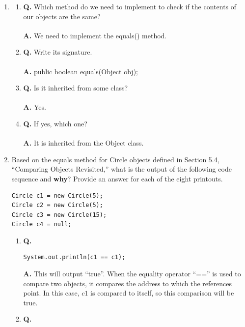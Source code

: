 \documentclass[12pt]{article}
\begin{document}
\begin{enumerate}
\begin{enumerate}[label=\Alph*]
     \\
  \end{enumerate}
  \item
    \begin{enumerate}[label=\Alph*]
    \item \textbf{Q.} Which method do we need to implement to check if the contents of our objects are the same?
    \\\\
     \textbf{A.} We need to implement the equals() method.
     \\
    \item \textbf{Q.} Write its signature.
    \\\\
     \textbf{A.} public boolean equals(Object obj);
     \\
    \item \textbf{Q.} Is it inherited from some class?
    \\\\
     \textbf{A.} Yes.
     \\
    \item \textbf{Q.} If yes, which one?
    \\\\
     \textbf{A.} It is inherited from the Object class.
     \\
  \end{enumerate}
  \item Based on the equals method for Circle objects defined in Section 5.4, ``Comparing Objects Revisited,'' what is the output of the following code sequence and \textbf{why}? Provide an answer for each of the eight printouts.
  \begin{lstlisting}
Circle c1 = new Circle(5);
Circle c2 = new Circle(5);
Circle c3 = new Circle(15);
Circle c4 = null;
  \end{lstlisting}
  \begin{enumerate}[label=\Alph*]
  \item \textbf{Q.}
  \begin{lstlisting}
System.out.println(c1 == c1);
  \end{lstlisting}
  \textbf{A.} This will output ``true''. When the equality operator ``=='' is used to compare two objects, it compares the address to which the references point. In this case, $c1$ is compared to itself, so this comparison will be true.
  \\
  \item \textbf{Q.}
  \begin{lstlisting}

\end{lstlisting}
\end{enumerate}
\end{enumerate}
\end{document}
